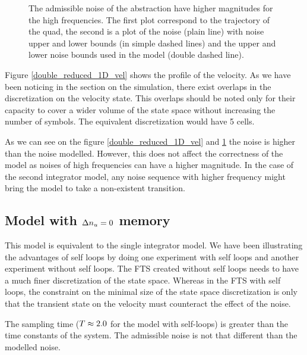 \begin{figure}[!ht]
  	\centering
	
  	\label{double_reduced_1D_noise}
  	\caption{The admissible noise of the abstraction have higher magnitudes for the high frequencies. The first plot correspond to the trajectory of the quad, the second is a plot of the noise (plain line) with noise upper and lower bounds (in simple dashed lines) and the upper and lower noise bounds used in the model (double dashed line).}
\end{figure}


Figure \ref{double_reduced_1D_vel} shows the profile of the velocity. As we have been noticing in the section on the simulation, there exist overlaps in the discretization on the velocity state.
This overlaps should be noted only for their capacity to cover a wider volume of the state space without increasing the number of symbols. The equivalent discretization would have 5 cells. 

As we can see on the figure \ref{double_reduced_1D_vel} and \ref{double_reduced_1D_noise} the noise is higher than the noise modelled. However, this does not affect the correctness of the model as noises of high frequencies can have a higher magnitude.
In the case of the second integrator model, any noise sequence with higher frequency might bring the model to take a non-existent transition.




\subsection{Model with $\Delta n_u=0$ memory} \label{sec:single_int}


This model is equivalent to the single integrator model.
We have been illustrating the advantages of self loops by doing one experiment with self loops and another experiment without self loops.
The FTS created without self loops needs to have a much finer discretization of the state space.
Whereas in the FTS with self loops, the constraint on the minimal size of the state space discretization is only that the transient state on the velocity must counteract the effect of the noise.

The sampling time ($T \approx 2.0$ for the model with self-loops) is greater than the time constants of the system.
The admissible noise is not that different than the modelled noise.



